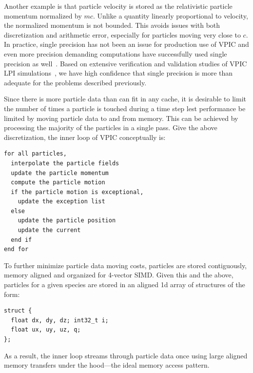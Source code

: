 \documentclass[journal,twoside]{IEEEtran}
\begin{document}
Another example is that particle velocity is stored as the
relativistic particle momentum normalized by $mc$.  Unlike a quantity
linearly proportional to velocity, the normalized momentum is not
bounded.  This avoids issues with both discretization and arithmetic
error, especially for particles moving very close to $c$.  In
practice, single precision has not been an issue for production use of
VPIC and even more precision demanding computations have successfully
used single precision as
well~\cite{Bowers_et_al_2006,Langou_et_al_2006,Lippert_et_al_2007}.
Based on extensive verification and validation studies of VPIC LPI
simulations~\cite{Yin_et_al_Phys_Plasmas_2006}, we have high
confidence that single precision is more than adequate for the
problems described previously.

Since there is more particle data than can fit in any cache, it is
desirable to limit the number of times a particle is touched during a
time step lest performance be limited by moving particle data to and
from memory.  This can be achieved by processing the majority of the
particles in a single pass.  Give the above discretization, the inner
loop of VPIC conceptually is:
\begin{verbatim}
for all particles,
  interpolate the particle fields
  update the particle momentum
  compute the particle motion
  if the particle motion is exceptional,
    update the exception list
  else
    update the particle position
    update the current
  end if
end for
\end{verbatim}
To further minimize particle data moving costs, particles are stored
contiguously, memory aligned and organized for 4-vector SIMD.  Given
this and the above, particles for a given species are stored in an
aligned 1d array of structures of the form:
\begin{verbatim}
struct {
  float dx, dy, dz; int32_t i;
  float ux, uy, uz, q;
};
\end{verbatim}
As a result, the inner loop streams through particle data once using
large aligned memory transfers under the hood---the ideal memory
access pattern.
\end{document}
